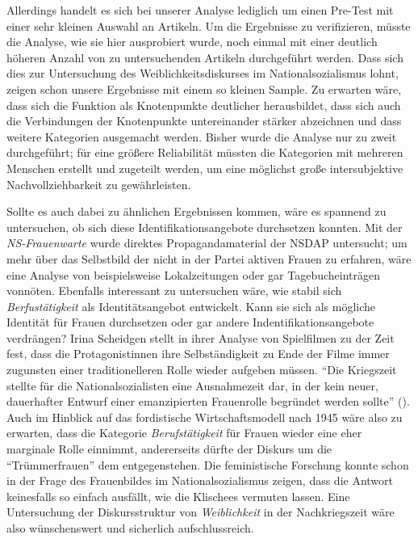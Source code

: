 \documentclass[12pt, titlepage=true, toc=bib]{scrartcl}
\begin{document}
{Allerdings handelt es sich bei unserer Analyse lediglich um einen Pre-Test mit einer sehr kleinen Auswahl an Artikeln. Um die Ergebnisse zu verifizieren, müsste die Analyse, wie sie hier ausprobiert wurde, noch einmal mit einer deutlich höheren Anzahl von zu untersuchenden Artikeln durchgeführt werden. Dass sich dies zur Untersuchung des Weiblichkeitsdiskurses im Nationalsozialismus lohnt, zeigen schon unsere Ergebnisse mit einem so kleinen Sample. Zu erwarten wäre, dass sich die Funktion als Knotenpunkte deutlicher herausbildet, dass sich auch die Verbindungen der Knotenpunkte untereinander stärker abzeichnen und dass weitere Kategorien ausgemacht werden. Bisher wurde die Analyse nur zu zweit durchgeführt; für eine größere Reliabilität müssten die Kategorien mit mehreren Menschen erstellt und zugeteilt werden, um eine möglichst große intersubjektive Nachvollziehbarkeit zu gewährleisten.

Sollte es auch dabei zu ähnlichen Ergebnissen kommen, wäre es spannend zu untersuchen, ob sich diese Identifikationsangebote durchsetzen konnten. Mit der \textit{NS-Frauenwarte} wurde direktes Propagandamaterial der NSDAP untersucht; um mehr über das Selbstbild der nicht in der Partei aktiven Frauen zu erfahren, wäre eine Analyse von beispielsweise Lokalzeitungen oder gar Tagebucheinträgen vonnöten. Ebenfalls interessant zu untersuchen wäre, wie stabil sich \textit{Berfustätigkeit} als Identitätsangebot entwickelt. Kann sie sich als mögliche Identität für Frauen durchsetzen oder gar andere Indentifikationsangebote verdrängen? Irina Scheidgen stellt in ihrer Analyse von Spielfilmen zu der Zeit fest, dass die Protagonistinnen ihre Selbständigkeit zu Ende der Filme immer zugunsten einer traditionelleren Rolle wieder aufgeben müssen. "`Die Kriegszeit stellte für die Nationalsozialisten eine Ausnahmezeit dar, in der kein neuer, dauerhafter Entwurf einer emanzipierten Frauenrolle begründet werden sollte"' (\cite[278]{scheidgen_frauenbilder_2015}). Auch im Hinblick auf das fordistische Wirtschaftsmodell nach 1945 wäre also zu erwarten, dass die Kategorie \textit{Berufstätigkeit} für Frauen wieder eine eher marginale Rolle einnimmt, andererseits dürfte der Diskurs um die "`Trümmerfrauen"' dem entgegenstehen. Die feministische Forschung konnte schon in der Frage des Frauenbildes im Nationalsozialismus zeigen, dass die Antwort keinesfalls so einfach ausfällt, wie die Klischees vermuten lassen. Eine Untersuchung der Diskursstruktur von \textit{Weiblichkeit} in der Nachkriegszeit wäre also wünschenswert und sicherlich aufschlussreich.

}
\end{document}
